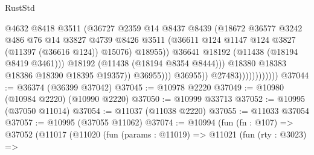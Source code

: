 \begin{lexlean}{RustStd}
\begin{coremodule}
                                              @4632
                                              @8418
                                              @3511
                                              (@36727
                                                @2359
                                                @14
                                                @8437
                                                @8439
                                                (@18672
                                                  @36577
                                                  @3242
                                                  @486
                                                  @76
                                                  @14
                                                  @3827
                                                  @4739
                                                  @8426
                                                  @3511
                                                  (@36611
                                                    @124
                                                    @1147
                                                    @124
                                                    @3827
                                                    (@11397 (@36616 @124))
                                                    @15076)
                                                  @18955))
                                              @36641
                                              @18192
                                              (@11438 (@18194 @8419 @3461)))
                                            @18192
                                            (@11438 (@18194 @8354 @8444)))
                                          @18380
                                          @18383
                                          @18386
                                          @18390
                                          @18395
                                          @19357))
                                      @36955)))
                                @36955))
                            @27483))))))))))))
@37044 := @36374 (@36399 @37042)
@37045 := @10978 @2220
@37049 := @10980 (@10984 @2220) (@10990 @2220)
@37050 := @10999 @33713
@37052 := @10995 (@37050 @11014)
@37054 := @11037 (@11038 @2220)
@37055 := @11033 @37054
@37057 := @10995 (@37055 @11062)
@37074 := @10994
    (fun (fn : @107) =>
    @37052
      (@11017
        (@11020
          (fun (params : @11019) =>
          @11021
            (fun (rty : @3023) =>

\end{coremodule}
\end{lexlean}
